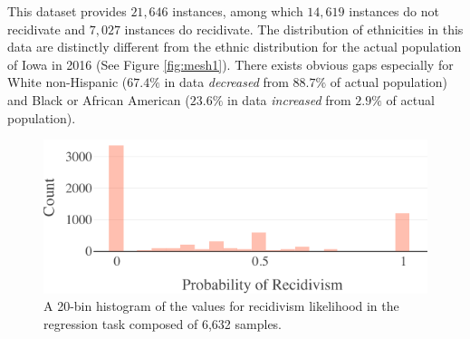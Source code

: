 \documentclass[conference]{IEEEtran}
\begin{document}
This dataset provides $21,646$ instances, among which $14,619$ instances do not recidivate and $7,027$ instances do recidivate. The distribution of ethnicities in this data are distinctly different from the ethnic distribution for the actual population of Iowa in 2016 (See Figure \ref{fig:mesh1}). There exists obvious gaps especially for White non-Hispanic ($67.4\%$ in data \textit{decreased} from $88.7\%$ of actual population) and Black or African American ($23.6\%$ in data \textit{increased} from  $2.9\%$ of actual population). 

\begin{figure}
  \includegraphics[width=.48\textwidth]{regression_values_histogram.pdf}
  \caption{A 20-bin histogram of the values for recidivism likelihood in the regression task composed of 6,632 samples.}
  \label{fig:histogram_of_recidivism}
\end{figure}
\end{document}
